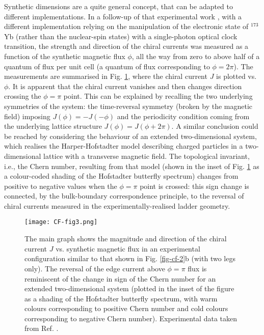 \documentclass[epj,final]{svjour}
\begin{document}
Synthetic dimensions are a quite general concept, that can be adapted to different implementations. In a follow-up of that experimental work \cite{livi2016synthetic}, with a different implementation relying on the manipulation of the electronic state of $^{173}$Yb (rather than the nuclear-spin states) with a single-photon optical clock transition, the strength and direction of the chiral currents was measured as a function of the synthetic magnetic flux $\phi$, all the way from zero to above half of a quantum of flux per unit cell (a quantum of flux corresponding to $\phi=2\pi$). The measurements are summarised in Fig. \ref{fig-cf-3}, where the chiral current $J$ is plotted vs. $\phi$. It is apparent that the chiral current vanishes and then changes direction crossing the $\phi=\pi$ point. This can be explained by recalling the two underlying symmetries of the system: the time-reversal symmetry (broken by the magnetic field) imposing $J(\phi)=-J(-\phi)$ and the periodicity condition coming from the underlying lattice structure $J(\phi)=J(\phi+2\pi)$. A similar conclusion could be reached by considering the behaviour of an extended two-dimensional system, which realises the Harper-Hofstadter model describing charged particles in a two-dimensional lattice with a transverse magnetic field. The topological invariant, i.e., the Chern number, resulting from that model (shown in the inset of Fig. \ref{fig-cf-3} as a colour-coded shading of the Hofstadter butterfly spectrum) changes from positive to negative values when the $\phi=\pi$ point is crossed: this sign change is connected, by the bulk-boundary correspondence principle, to the reversal of chiral currents measured in the experimentally-realised ladder geometry.

\begin{figure}
\begin{center}
\texttt{[image: CF-fig3.png]}
\end{center}
\caption{The main graph shows the magnitude and direction of the chiral current $J$ vs. synthetic magnetic flux in an experimental configuration similar to that shown in Fig. \ref{fig-cf-2}b (with two legs only). The reversal of the edge current above $\phi=\pi$ flux is reminiscent of the change in sign of the Chern number for an extended two-dimensional system (plotted in the inset of the figure as a shading of the Hofstadter butterfly spectrum, with warm colours corresponding to positive Chern number and cold colours corresponding to negative Chern number). Experimental data taken from Ref. \cite{livi2016synthetic}.}
\label{fig-cf-3}
\end{figure}
\end{document}
